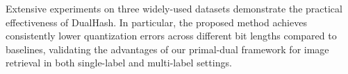 Extensive experiments on three widely-used datasets demonstrate the practical effectiveness of DualHash. In particular, the proposed method achieves consistently lower quantization errors across different bit lengths compared to baselines, validating the advantages of our primal-dual framework for image retrieval in both single-label and multi-label settings.







